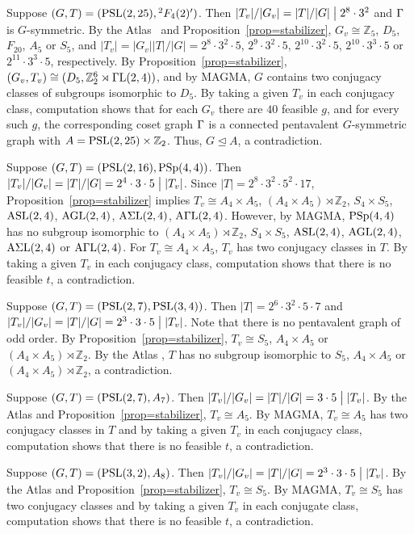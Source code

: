 \documentclass[12pt]{article}
\def\di{\bigm|} \def\lg{\langle} \def\rg{\rangle}
\def\PSL{\hbox{\rm PSL}}\def\PSU{\hbox{\rm PSU}}
\def\PSp{\hbox{\rm PSp}}\def\P\GammaL{\hbox{\rm P\Gamma L}} \def\ASIL{\hbox{\rm A\Sigma L}}
\def\mz{{\mathbb Z}}
\begin{document}
Suppose $(G,T)=(\PSL(2,25), {}^2F_{4}(2)')$. Then $|T_v|/|G_v|=|T|/|G|\di 2^8\cdot3^2$ and $\Gamma$ is $G$-symmetric.
By the Atlas~\cite[p. 16]{Atlas} and Proposition~\ref{prop=stabilizer}, $G_v\cong \mz_5$, $D_5$, $F_{20}$, $A_5$
or $S_5$, and $|T_v|=|G_v||T|/|G|=2^8\cdot3^2 \cdot 5$, $2^9\cdot3^2 \cdot 5$, $2^{10}\cdot 3^2\cdot 5$,
$2^{10}\cdot 3^3\cdot 5$ or $2^{11}\cdot 3^3\cdot 5$, respectively. By Proposition~\ref{prop=stabilizer},
$(G_v,T_v)\cong (D_5,\mathbb{Z}^6_2\rtimes  {\rm \Gamma L}(2,4))$, and by MAGMA, $G$ contains two conjugacy
classes of subgroups isomorphic to $D_5$. By taking a given $T_v$ in each conjugacy class, computation shows
that for each $G_v$ there are $40$ feasible $g$, and for every such $g$, the corresponding coset graph $\Gamma$
is a connected pentavalent $G$-symmetric graph with $A=\PSL(2,25)\times \mz_2$. Thus, $G\unlhd A$, a contradiction.

Suppose $(G,T)=(\PSL(2,16),\PSp(4,4))$. Then $|T_v|/|G_v|=|T|/|G|=2^4 \cdot 3\cdot5\di |T_v|$.
Since $|T|=2^8 \cdot 3^2 \cdot5^2 \cdot17$, Proposition~\ref{prop=stabilizer} implies $T_v\cong A_4 \times A_5$,
$(A_4 \times A_5)\rtimes \mz_2$, $S_4 \times S_5$, $\hbox{\rm ASL}(2,4)$, $\rm AGL(2,4)$, $\rm A\Sigma L(2,4)$, $\rm A\Gamma L(2,4)$.
However, by MAGMA, $\PSp(4,4)$ has no subgroup isomorphic to $(A_4 \times A_5)\rtimes \mz_2$, $S_4 \times S_5$, $\hbox{\rm ASL}(2,4)$,
$\rm AGL(2,4)$, $\rm A\Sigma L(2,4)$ or $\rm A\Gamma L(2,4)$. For $T_v\cong  A_4 \times A_5$, $T_v$ has two conjugacy classes in $T$. By taking a given $T_v$ in each conjugacy class, computation shows that
there is no feasible $t$, a contradiction.

Suppose $(G,T)=(\PSL(2,7),\PSL(3,4))$. Then $|T|=2^6 \cdot 3^2 \cdot5 \cdot7$ and $|T_v|/|G_v|=|T|/|G|=2^3 \cdot 3\cdot5\di |T_v|$. Note that
there is no pentavalent graph of odd order.
By Proposition~\ref{prop=stabilizer}, $T_v\cong S_5$, $A_4 \times A_5$ or $(A_4 \times A_5)\rtimes \mz_2$.
By the Atlas \cite[p. 23]{Atlas}, $T$ has no subgroup isomorphic to $S_5$, $A_4 \times A_5$
or $(A_4 \times A_5)\rtimes \mz_2$, a contradiction.

Suppose $(G,T)=(\PSL(2,7),A_7)$. Then $|T_v|/|G_v|=|T|/|G|= 3\cdot5\di |T_v|$. By the Atlas \cite[p. 10]{Atlas}
and Proposition~\ref{prop=stabilizer}, $T_v\cong A_5 $. By MAGMA, $T_v \cong A_{5}$ has two conjugacy classes in $T$
and by taking a given $T_v$ in each conjugacy class, computation shows that there is no feasible $t$, a contradiction.

Suppose $(G,T)=(\PSL(3,2),A_8)$. Then $|T_v|/|G_v|=|T|/|G|= 2^3 \cdot3\cdot5\di |T_v|$. By the Atlas \cite[p. 22]{Atlas}
and Proposition~\ref{prop=stabilizer}, $T_v\cong S_5 $. By MAGMA, $T_v \cong S_5$ has two conjugacy classes and
by taking a given $T_v$ in each conjugate class, computation shows that there is no feasible $t$, a contradiction.
\end{document}
